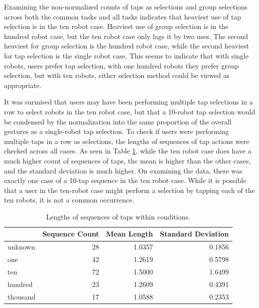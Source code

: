 Examining the non-normalized counts of taps as selections and group selections across both the common tasks and all tasks indicates that heaviest use of tap selection is in the ten robot case. Heaviest use of group selection is in the hundred robot case, but the ten robot case only lags it by two uses. The second heaviest for group selection is the hundred robot case, while the second heaviest for tap selection is the single robot case. This seems to indicate that with single robots, users prefer tap selection, with one hundred robots they prefer group selection, but with ten robots, either selection method could be viewed as appropriate. 

It was surmised that users may have been performing multiple tap selections in a row to select robots in the ten robot case, but that a 10-robot tap selection would be condensed by the normalization into the same proportion of the overall gestures as a single-robot tap selection. 
To check if users were performing multiple taps in a row as selections, the lengths of sequences of tap actions were checked across all cases. 
As seen in Table \ref{tab:tap_seq_len}, while the ten robot case does have a much higher count of sequences of taps, the mean is higher than the other cases, and the standard deviation is much higher. 
On examining the data, there was exactly one case of a 10-tap sequence in the ten robot case.
While it is possible that a user in the ten-robot case might perform a selection by tapping each of the ten robots, it is not a common occurrence. 

\begin{table}
	\begin{tabular}{l | r r r}
		& Sequence Count & Mean Length & Standard Deviation \\ 
		\hline
		unknown & 28 & 1.0357 & 0.1856 \\
		one & 42 & 1.2619 & 0.5798\\
		ten & 72 & 1.5000 & 1.6499\\
		hundred & 23 & 1.2609 & 0.4391\\
		thousand & 17 & 1.0588 & 0.2353\\
	\end{tabular}
	\caption{Lengths of sequences of taps within conditions.}
	\label{tab:tap_seq_len}
\end{table}

